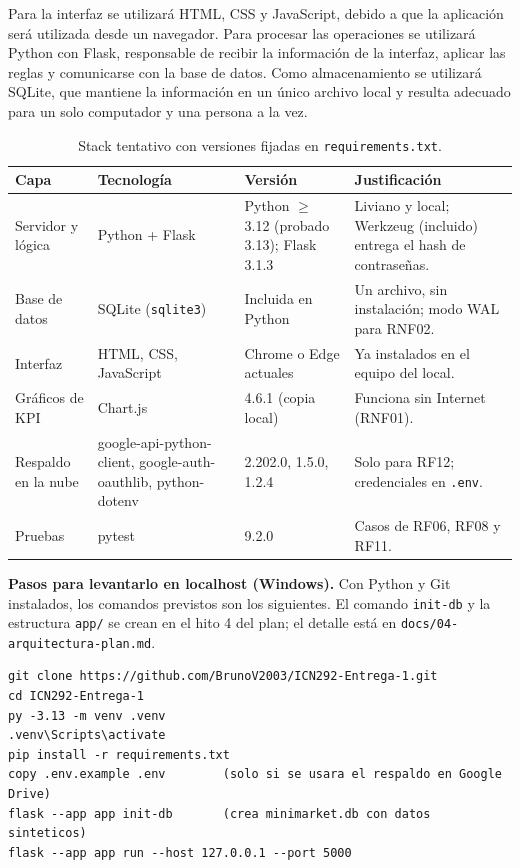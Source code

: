 \documentclass[10pt,a4paper]{article}
\begin{document}
Para la interfaz se utilizará HTML, CSS y JavaScript, debido a que la aplicación será utilizada desde un navegador. Para procesar las operaciones se utilizará Python con Flask, responsable de recibir la información de la interfaz, aplicar las reglas y comunicarse con la base de datos. Como almacenamiento se utilizará SQLite, que mantiene la información en un único archivo local y resulta adecuado para un solo computador y una persona a la vez.

\begin{table}[H]
\centering\small
\begin{tabularx}{\textwidth}{@{}p{3.0cm}p{3.6cm}p{3.4cm}Y@{}}
\toprule
\textbf{Capa} & \textbf{Tecnología} & \textbf{Versión} & \textbf{Justificación} \\
\midrule
Servidor y lógica & Python + Flask & Python $\ge$ 3.12 (probado 3.13); Flask 3.1.3 & Liviano y local; Werkzeug (incluido) entrega el hash de contraseñas. \\
Base de datos & SQLite (\texttt{sqlite3}) & Incluida en Python & Un archivo, sin instalación; modo WAL para RNF02. \\
Interfaz & HTML, CSS, JavaScript & Chrome o Edge actuales & Ya instalados en el equipo del local. \\
Gráficos de KPI & Chart.js & 4.6.1 (copia local) & Funciona sin Internet (RNF01). \\
Respaldo en la nube & google-api-python-client, google-auth-oauthlib, python-dotenv & 2.202.0, 1.5.0, 1.2.4 & Solo para RF12; credenciales en \texttt{.env}. \\
Pruebas & pytest & 9.2.0 & Casos de RF06, RF08 y RF11. \\
\bottomrule
\end{tabularx}
\caption{Stack tentativo con versiones fijadas en \texttt{requirements.txt}.}
\end{table}

\textbf{Pasos para levantarlo en localhost (Windows).} Con Python y Git instalados, los comandos previstos son los siguientes. El comando \texttt{init-db} y la estructura \texttt{app/} se crean en el hito 4 del plan; el detalle está en \texttt{docs/04-arquitectura-plan.md}.

\begin{small}
\begin{verbatim}
git clone https://github.com/BrunoV2003/ICN292-Entrega-1.git
cd ICN292-Entrega-1
py -3.13 -m venv .venv
.venv\Scripts\activate
pip install -r requirements.txt
copy .env.example .env        (solo si se usara el respaldo en Google Drive)
flask --app app init-db       (crea minimarket.db con datos sinteticos)
flask --app app run --host 127.0.0.1 --port 5000
\end{verbatim}
\end{small}
\end{document}
